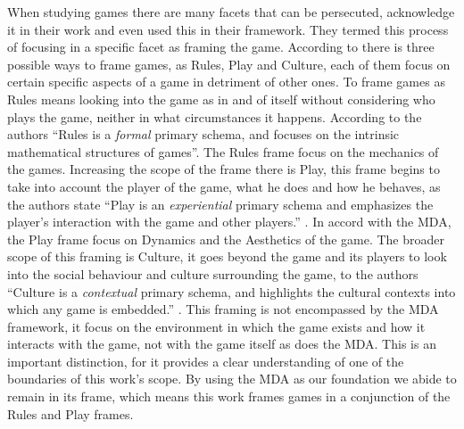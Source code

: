 When studying games there are many facets that can be persecuted, \cite{salen2004rules} acknowledge it in their work and even used this in their framework. They termed this process of focusing in a specific facet as framing the game. According to \cite{salen2004rules} there is three possible ways to frame games, as Rules, Play and Culture, each of them focus on certain specific aspects of a game in detriment of other ones. To frame games as Rules means looking into the game as in and of itself without considering who plays the game, neither in what circumstances it happens. According to the authors ``Rules is a \textit{formal} primary schema, and focuses on the intrinsic mathematical structures of games''\citep{salen2004rules}. The Rules frame focus on the mechanics of the games. Increasing the scope of the frame there is Play, this frame begins to take into account the player of the game, what he does and how he behaves, as the authors state ``Play is an \textit{experiential} primary schema and emphasizes the player's interaction with the game and other players.'' \cite{salen2004rules}. In accord with the MDA, the Play frame focus on Dynamics and the Aesthetics of the game. The broader scope of this framing is Culture, it goes beyond the game and its players to look into the social behaviour and culture surrounding the game, to the authors ``Culture is a \textit{contextual} primary schema, and highlights the cultural contexts into which any game is embedded.'' \cite{salen2004rules}. This framing is not encompassed by the MDA framework, it focus on the environment in which the game exists and how it interacts with the game, not with the game itself as does the MDA. This is an important distinction, for it provides a clear understanding of one of the boundaries of this work's scope. By using the MDA as our foundation we abide to remain in its frame, which means this work frames games in a conjunction of the Rules and Play frames.

